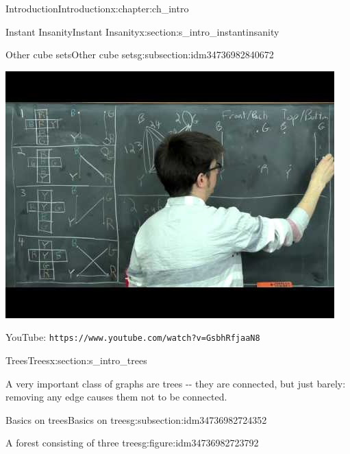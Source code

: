 \documentclass[oneside,10pt,]{book}
\newcommand{\mono}[1]{\texttt{#1}}
\numberwithin{equation}{section}
\newlength{\qrsize}
\newlength{\previewwidth}
\begin{document}
\begin{chapterptx}{Introduction}{}{Introduction}{}{}{x:chapter:ch_intro}
\begin{sectionptx}{Instant Insanity}{}{Instant Insanity}{}{}{x:section:s_intro_instantinsanity}
\begin{subsectionptx}{Other cube sets}{}{Other cube sets}{}{}{g:subsection:idm34736982840672}
\begin{tcbraster}[raster columns=2, raster column skip=1pt, raster halign=center, raster force size=false, raster left skip=0pt, raster right skip=0pt]
\begin{tcolorbox}[previewstyle, width=\previewwidth]%
\includegraphics[width=0.80\linewidth,height=\qrsize,keepaspectratio]{images/video-1.jpg}%
\end{tcolorbox}%
\begin{tcolorbox}[qrstyle]%
{\hypersetup{urlcolor=black}}%
\end{tcolorbox}%
\begin{tcolorbox}[captionstyle]%
\small YouTube: \mono{https://www.youtube.com/watch?v=GsbhRfjaaN8}\end{tcolorbox}%
\end{tcbraster}%
\end{subsectionptx}
\end{sectionptx}
%
%
\typeout{************************************************}
\typeout{************************************************}
%
\begin{sectionptx}{Trees}{}{Trees}{}{}{x:section:s_intro_trees}
\begin{introduction}{}%
A very important class of graphs are trees -{}-{} they are connected, but just barely: removing any edge causes them not to be connected.%
\end{introduction}%
%
%
\typeout{************************************************}
\typeout{************************************************}
%
\begin{subsectionptx}{Basics on trees}{}{Basics on trees}{}{}{g:subsection:idm34736982724352}
\begin{figureptx}{A forest consisting of three trees}{g:figure:idm34736982723792}{}%
\begin{image}{0.1}{0.8}{0.1}%

\end{image}
\end{figureptx}
\end{subsectionptx}
\end{sectionptx}
\end{chapterptx}
\end{document}
